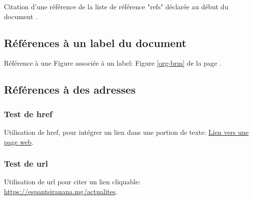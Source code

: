 Citation d'une référence de la liste de référence "refs" déclarée au début du document .

\subsection{Références à un label du document}

Référence à une Figure associée à un label: Figure \ref{org-brm} de la page \pageref{org-brm}.

\subsection{Références à des adresses}

\subsubsection{Test de href}

Utilisation de href, pour intégrer un lien dans une portion de texte:
\href{https://www.rahombe.com/}{Lien vers une page web}.

\subsubsection{Test de url}

Utilisation de url pour citer un lien cliquable:
\url{https://espantsiranana.mg/actualites}.
